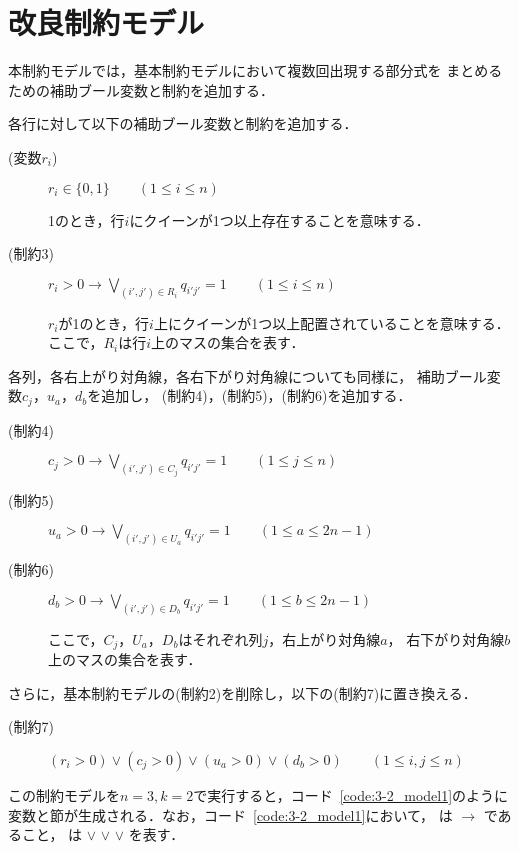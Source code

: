 \section{改良制約モデル}
本制約モデルでは，基本制約モデルにおいて複数回出現する部分式を
まとめるための補助ブール変数と制約を追加する．

各行に対して以下の補助ブール変数と制約を追加する．
\begin{description}
 \item[(変数$r_i$)] $r_{i} \in \{0,1\} \qquad (1 \leq i \leq n)$\par
  1のとき，行$i$にクイーンが1つ以上存在することを意味する．
 \item[(制約3)] $r_{i}>0 \rightarrow \bigvee\limits_{(i',j')\in R_{i}} q_{i'j'}=1 \qquad (1 \leq i \leq n)$ \par
  $r_{i}$が1のとき，行$i$上にクイーンが1つ以上配置されていることを意味する．
  ここで，$R_i$は行$i$上のマスの集合を表す．
\end{description}
%
各列，各右上がり対角線，各右下がり対角線についても同様に，
補助ブール変数$c_{j}$，$u_{a}$，$d_{b}$を追加し，
(制約4)，(制約5)，(制約6)を追加する．
%
\begin{description}
 \item[(制約4)] $c_{j}>0 \rightarrow \bigvee\limits_{(i',j')\in C_{j}} q_{i'j'}=1 \qquad (1 \leq j \leq n)$ 
 \item[(制約5)] $u_{a}>0 \rightarrow \bigvee\limits_{(i',j')\in U_{a}} q_{i'j'}=1 \qquad (1 \leq a \leq 2n-1)$ 
 \item[(制約6)] $d_{b}>0 \rightarrow \bigvee\limits_{(i',j')\in D_{b}} q_{i'j'}=1 \qquad (1 \leq b \leq 2n-1)$ \par
  ここで，$C_j$，$U_{a}$，$D_{b}$はそれぞれ列$j$，右上がり対角線$a$，
  右下がり対角線$b$上のマスの集合を表す．
\end{description}

さらに，基本制約モデルの(制約2)を削除し，以下の(制約7)に置き換える．
\begin{description}
 \item[(制約7)] $(r_i > 0) \vee (c_j >0) \vee (u_{a}>0) \vee (d_{b}>0) \qquad (1 \leq i,j \leq n)$
\end{description}

この制約モデルを$n=3,k=2$で実行すると，コード~\ref{code:3-2_model1}のように
変数と節が生成される．なお，コード~\ref{code:3-2_model1}において，
  
は $\rightarrow$ 
   
であること，  
 は $\vee$ 
 $\vee$  $\vee$ を表す．

